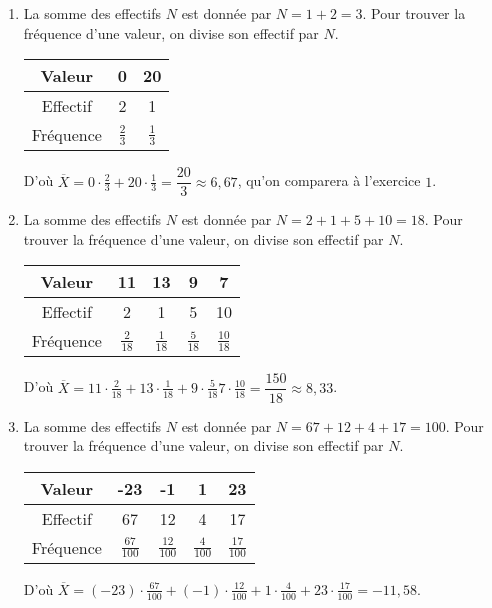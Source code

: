 \documentclass[a4paper, 14pt]{extarticle}
\theoremstyle{plain}
\theoremstyle{definition}
\begin{document}
{\begin{enumerate}
				La moyenne est la somme des produits Valeur $\times$ Fréquence.
				D'où $\overline{X} = 0 \cdot \frac13 + 20 \cdot \frac23 =\dfrac{40}3 \approx 13,33$, qu'on comparera à l'exercice $1$.
				
			\item 
				La somme des effectifs $N$ est donnée par $N = 1+2 = 3$.
				Pour trouver la fréquence d'une valeur, on divise son effectif par $N$.
				
				\begin{tabular}{|c|c|c|}\hline
				Valeur   & 0 & 20 \\ \hline
				Effectif & 2 & 1  \\ \hline
				Fréquence & $\frac23$ & $\frac13$ \\ \hline
				\end{tabular}
				
				D'où $\overline{X} = 0 \cdot \frac23 + 20 \cdot \frac13 =\dfrac{20}3 \approx 6,67$, qu'on comparera à l'exercice $1$.
				
			\item 
				La somme des effectifs $N$ est donnée par $N = 2+1+5+10 = 18$.
				Pour trouver la fréquence d'une valeur, on divise son effectif par $N$.
				
				\begin{tabular}{|c|c|c|c|c|}\hline
				Valeur   & 11 & 13 & 9 & 7 \\ \hline
				Effectif & 2 & 1 & 5 & 10 \\ \hline
				Fréquence & $\frac2{18}$ & $\frac1{18}$ & $\frac5{18}$ & $\frac{10}{18}$  \\ \hline
				\end{tabular}
				
				D'où $\overline{X} = 11\cdot\frac2{18} + 13\cdot \frac1{18} + 9\cdot \frac5{18} 7\cdot\frac{10}{18} = \dfrac{150}{18} \approx 8,33 $.
				
			\item 
				La somme des effectifs $N$ est donnée par $N = 67+12+4+17 = 100$.
				Pour trouver la fréquence d'une valeur, on divise son effectif par $N$.
				
				\begin{tabular}{|c|c|c|c|c|}\hline
				Valeur   & -23 & -1 & 1 & 23 \\ \hline
				Effectif & 67 & 12 & 4 & 17 \\ \hline
				Fréquence & $\frac{67}{100}$ & $\frac{12}{100}$ & $\frac{4}{100}$ & $\frac{17}{100}$ \\ \hline
				\end{tabular}
				
				D'où $\overline{X} = (-23) \cdot \frac{67}{100} + (-1)\cdot \frac{12}{100} + 1\cdot \frac{4}{100} + 23\cdot \frac{17}{100} = -11,58$.

		\end{enumerate}


}
\end{document}
